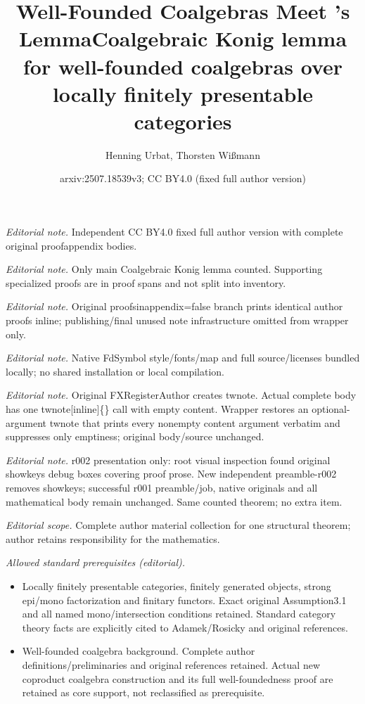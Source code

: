 \documentclass[10pt,a4paper]{article}
\title{Well-Founded Coalgebras Meet \Konig's Lemma}
\title{Coalgebraic Konig lemma for well-founded coalgebras over locally finitely presentable categories}
\author{Henning Urbat, Thorsten Wißmann}
\date{arxiv:2507.18539v3; CC BY4.0 (fixed full author version)}
\theoremstyle{definition}
\theoremstyle{remark}
\numberwithin{equation}{section}
\theoremstyle{plain}
\theoremstyle{definition}
\begin{document}
\maketitle
\noindent\textit{Editorial note.} Independent CC BY4.0 fixed full author version with complete original proofappendix bodies.\par\medskip
\noindent\textit{Editorial note.} Only main Coalgebraic Konig lemma counted. Supporting specialized proofs are in proof spans and not split into inventory.\par\medskip
\noindent\textit{Editorial note.} Original proofsinappendix=false branch prints identical author proofs inline; publishing/final unused note infrastructure omitted from wrapper only.\par\medskip
\noindent\textit{Editorial note.} Native FdSymbol style/fonts/map and full source/licenses bundled locally; no shared installation or local compilation.\par\medskip
\noindent\textit{Editorial note.} Original FXRegisterAuthor creates twnote. Actual complete body has one twnote[inline]\{\} call with empty content. Wrapper restores an optional-argument twnote that prints every nonempty content argument verbatim and suppresses only emptiness; original body/source unchanged.\par\medskip
\noindent\textit{Editorial note.} r002 presentation only: root visual inspection found original showkeys debug boxes covering proof prose. New independent preamble-r002 removes showkeys; successful r001 preamble/job, native originals and all mathematical body remain unchanged. Same counted theorem; no extra item.\par\medskip
\noindent\textit{Editorial scope.} Complete author material collection for one structural theorem; author retains responsibility for the mathematics.\par\medskip
\noindent\textit{Allowed standard prerequisites (editorial).}\begin{itemize}
\item Locally finitely presentable categories, finitely generated objects, strong epi/mono factorization and finitary functors. Exact original Assumption3.1 and all named mono/intersection conditions retained. Standard category theory facts are explicitly cited to Adamek/Rosicky and original references.
\item Well-founded coalgebra background. Complete author definitions/preliminaries and original references retained. Actual new coproduct coalgebra construction and its full well-foundedness proof are retained as core support, not reclassified as prerequisite.
\end{itemize}\medskip
\end{document}
